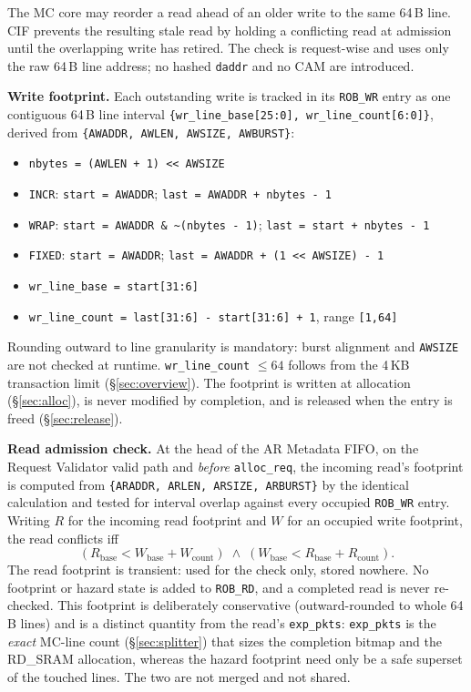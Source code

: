 The MC core may reorder a read ahead of an older write to the same 64\,B
line.  CIF prevents the resulting stale read by holding a conflicting read at
admission until the overlapping write has retired.  The check is request-wise
and uses only the raw 64\,B line address; no hashed \texttt{daddr} and no CAM
are introduced.

\textbf{Write footprint.} Each outstanding write is tracked in its
\texttt{ROB\_WR} entry as one contiguous 64\,B line interval
\texttt{\{wr\_line\_base[25:0], wr\_line\_count[6:0]\}}, derived from
\texttt{\{AWADDR, AWLEN, AWSIZE, AWBURST\}}:
\begin{itemize}[noitemsep]
  \item \texttt{nbytes = (AWLEN + 1) << AWSIZE}
  \item \texttt{INCR}:  \texttt{start = AWADDR};
        \texttt{last = AWADDR + nbytes - 1}
  \item \texttt{WRAP}:  \texttt{start = AWADDR \& \textasciitilde(nbytes - 1)};
        \texttt{last = start + nbytes - 1}
  \item \texttt{FIXED}: \texttt{start = AWADDR};
        \texttt{last = AWADDR + (1 << AWSIZE) - 1}
  \item \texttt{wr\_line\_base  = start[31:6]}
  \item \texttt{wr\_line\_count = last[31:6] - start[31:6] + 1}, range
        \texttt{[1,64]}
\end{itemize}
Rounding outward to line granularity is mandatory: burst alignment and
\texttt{AWSIZE} are not checked at runtime.  \texttt{wr\_line\_count} $\le 64$
follows from the 4\,KB transaction limit (\S\ref{sec:overview}).  The
footprint is written at allocation (\S\ref{sec:alloc}), is never modified by
completion, and is released when the entry is freed (\S\ref{sec:release}).

\textbf{Read admission check.} At the head of the AR Metadata FIFO, on the
Request Validator valid path and \emph{before} \texttt{alloc\_req}, the
incoming read's footprint is computed from
\texttt{\{ARADDR, ARLEN, ARSIZE, ARBURST\}} by the identical calculation and
tested for interval overlap against every occupied \texttt{ROB\_WR} entry.
Writing $R$ for the incoming read footprint and $W$ for an occupied write
footprint, the read conflicts iff
\[
  (R_{\mathrm{base}} < W_{\mathrm{base}} + W_{\mathrm{count}})
  \;\wedge\;
  (W_{\mathrm{base}} < R_{\mathrm{base}} + R_{\mathrm{count}}).
\]
The read footprint is transient: used for the check only, stored nowhere.  No
footprint or hazard state is added to \texttt{ROB\_RD}, and a completed read
is never re-checked.  This footprint is deliberately conservative
(outward-rounded to whole 64\,B lines) and is a distinct quantity from the
read's \texttt{exp\_pkts}: \texttt{exp\_pkts} is the \emph{exact} MC-line
count (\S\ref{sec:splitter}) that sizes the completion bitmap and the
RD\_SRAM allocation, whereas the hazard footprint need only be a safe
superset of the touched lines.  The two are not merged and not shared.

